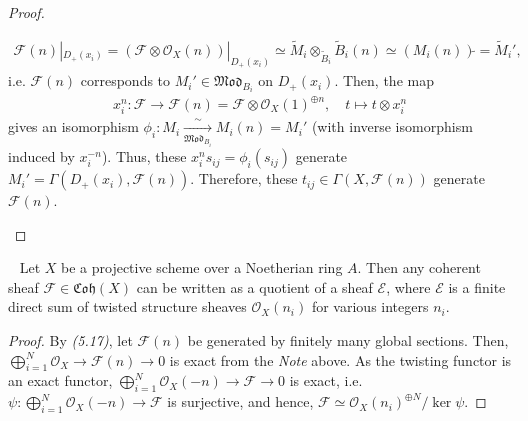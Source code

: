 \documentclass[11pt,a4paper,footinclude=true,headinclude=true]{scrbook} %
\newcommand{\EE}{\mathscr{E}}
\newcommand{\FF}{\mathscr{F}}
\newcommand{\OO}{\mathcal{O}}
\newcommand{\<}{\langle}
\newcommand{\>}{\rangle}
\newcommand{\MOD}{\mathfrak{Mod}}
\newcommand{\coh}{\mathfrak{Coh}}
\newenvironment{corollary}[2][]
{\renewcommand\theinnercustomcol{#2}\innercustomcol[#1]
\begin{mdframed}[backgroundcolor=gray!20]\ }
{\end{mdframed}\endinnercustomcol}
\begin{document}
\begin{proof}
\begin{itemize}
        \begin{align*}
            \FF(n)|_{D_+(x_i)}=(\FF\otimes\OO_X(n))|_{D_+(x_i)}\simeq\widetilde{M}_i\otimes_{\widetilde{B}_i}\widetilde{B}_i(n)\simeq(M_i(n))\widetilde{}=\widetilde{M}_i',
        \end{align*}
        i.e. $\FF(n)$ corresponds to $M_i'\in \MOD_{B_i}$ on $D_+(x_i)$. Then, the map
        \begin{align*}
            x_i^n:\FF\longrightarrow\FF(n)=\FF\otimes\OO_X(1)^{\oplus n},\quad t\longmapsto t\otimes x_i^n
        \end{align*}
        gives an isomorphism $\phi_i:M_i\xrightarrow[\MOD_{B_i}]{\sim}M_i(n)=M_i'$ (with inverse isomorphism induced by $x_i^{-n}$). Thus, these $x_i^ns_{ij}=\phi_i(s_{ij})$ generate $M_i'=\Gamma(D_+(x_i),\FF(n))$. Therefore, these $t_{ij}\in\Gamma(X,\FF(n))$ generate $\FF(n)$.
    \end{itemize}
\end{proof}

\begin{corollary}{5.18}
    Let $X$ be a projective scheme over a Noetherian ring $A$. Then any coherent sheaf $\FF\in\coh(X)$ can be written as a quotient of a sheaf $\EE$, where $\EE$ is a finite direct sum of twisted structure sheaves $\OO_X(n_i)$ for various integers $n_i$.
\end{corollary}
\begin{proof}
    By \textit{(5.17)}, let $\FF(n)$ be generated by finitely many global sections. Then, $\bigoplus_{i=1}^N\OO_X\to\FF(n)\to0$ is exact from the \textit{Note} above. As the twisting functor is an exact functor, $\bigoplus_{i=1}^N\OO_X(-n)\to\FF\to0$ is exact, i.e. $\psi:\bigoplus_{i=1}^N\OO_X(-n)\to\FF$ is surjective, and hence, $\FF\simeq\OO_X(n_i)^{\oplus N}/\ker\psi$.
\end{proof}
\end{document}
